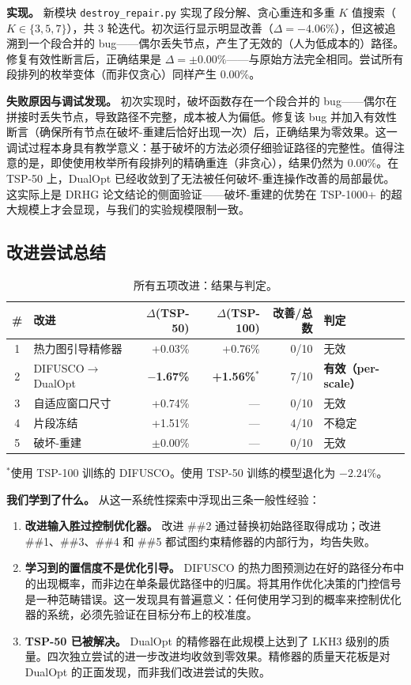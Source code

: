 \documentclass[11pt,a4paper]{ctexart}
\begin{document}
\textbf{实现。} 新模块 \texttt{destroy\_repair.py} 实现了段分解、贪心重连和多重 $K$ 值搜索（$K \in \{3,5,7\}$），共 3 轮迭代。初次运行显示明显改善（$\Delta = -4.06\%$），但这被追溯到一个段合并的 bug——偶尔丢失节点，产生了无效的（人为低成本的）路径。修复有效性断言后，正确结果是 $\Delta = \pm 0.00\%$——与原始方法完全相同。尝试所有段排列的枚举变体（而非仅贪心）同样产生 0.00\%。

\textbf{失败原因与调试发现。} 初次实现时，破坏函数存在一个段合并的 bug——偶尔在拼接时丢失节点，导致路径不完整，成本被人为偏低。修复该 bug 并加入有效性断言（确保所有节点在破坏-重建后恰好出现一次）后，正确结果为零效果。这一调试过程本身具有教学意义：基于破坏的方法必须仔细验证路径的完整性。值得注意的是，即使使用枚举所有段排列的精确重连（非贪心），结果仍然为 0.00\%。在 TSP-50 上，DualOpt 已经收敛到了无法被任何破坏-重连操作改善的局部最优。这实际上是 DRHG 论文结论的侧面验证——破坏-重建的优势在 TSP-1000+ 的超大规模上才会显现，与我们的实验规模限制一致。

\subsection{改进尝试总结}

\begin{table}[H]
\centering
\small
\caption{所有五项改进：结果与判定。}
\label{tab:improvements}
\begin{tabular}{@{}clrrrl@{}}
\toprule
\# & 改进 & $\Delta$(TSP-50) & $\Delta$(TSP-100) & 改善/总数 & 判定 \\
\midrule
1 & 热力图引导精修器 & +0.03\% & +0.76\% & 0/10 & 无效 \\
2 & DIFUSCO$\rightarrow$DualOpt & \textbf{$-$1.67\%} & \textbf{+1.56\%}$^*$ & 7/10 & \textbf{有效（per-scale）} \\
3 & 自适应窗口尺寸 & +0.74\% & --- & 0/10 & 无效 \\
4 & 片段冻结 & +1.51\% & --- & 4/10 & 不稳定 \\
5 & 破坏-重建 & $\pm$0.00\% & --- & 0/10 & 无效 \\
\bottomrule
\end{tabular}

\smallskip
\footnotesize{$^*$使用 TSP-100 训练的 DIFUSCO。使用 TSP-50 训练的模型退化为 $-2.24\%$。}
\end{table}

\textbf{我们学到了什么。} 从这一系统性探索中浮现出三条一般性经验：

\begin{enumerate}[nosep]
\item \textbf{改进输入胜过控制优化器。} 改进 \#\#2 通过替换初始路径取得成功；改进 \#\#1、\#\#3、\#\#4 和 \#\#5 都试图约束精修器的内部行为，均告失败。
\item \textbf{学习到的置信度不是优化引导。} DIFUSCO 的热力图预测边在好的路径分布中的出现概率，而非边在单条最优路径中的归属。将其用作优化决策的门控信号是一种范畴错误。这一发现具有普遍意义：任何使用学习到的概率来控制优化器的系统，必须先验证在目标分布上的校准度。
\item \textbf{TSP-50 已被解决。} DualOpt 的精修器在此规模上达到了 LKH3 级别的质量。四次独立尝试的进一步改进均收敛到零效果。精修器的质量天花板是对 DualOpt 的正面发现，而非我们改进尝试的失败。
\end{enumerate}
\end{document}
